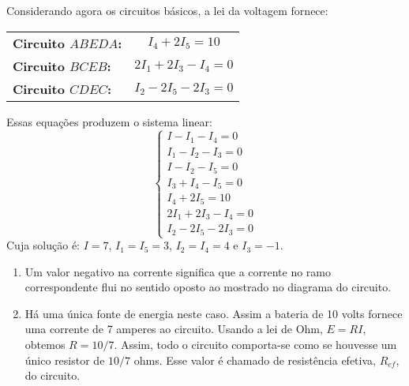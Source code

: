 \begin{exemplos}
\begin{solucao}
\begin{enumerate}
            Considerando agora os circuitos básicos, a lei da voltagem fornece:
            \begin{center}
                \begin{tabular}{lc}
                    \textbf{Circuito $ABEDA$:} & $I_4 + 2I_5 = 10$\\
                    \textbf{Circuito $BCEB$:} & $2I_1 + 2I_3 - I_4 = 0$\\
                    \textbf{Circuito $CDEC$:} & $I_2 - 2I_5 - 2I_3 = 0$
                \end{tabular}
            \end{center}
            Essas equações produzem o sistema linear:
            \[
                \begin{cases}
                    I - I_1 - I_4 = 0\\
                    I_1 - I_2 - I_3 = 0\\
                    I - I_2 - I_5 = 0\\
                    I_3 + I_4 - I_5 = 0\\
                    I_4 + 2I_5 = 10\\
                    2I_1 + 2I_3 - I_4 = 0\\
                    I_2 - 2I_5 - 2I_3 = 0
                \end{cases}
            \]
            Cuja solução é: $I = 7$, $I_1 = I_5 = 3$, $I_2 = I_4 = 4$ e $I_3 = -1$.
        \end{enumerate}
    \end{solucao}
\end{exemplos}


\begin{observacoes}
    \begin{enumerate}
        \item Um valor negativo na corrente significa que a corrente no ramo correspondente flui no sentido oposto ao mostrado no diagrama do circuito.

        \item Há uma única fonte de energia neste caso. Assim a bateria de 10 volts fornece uma corrente de 7 amperes ao circuito. Usando a lei de Ohm, $E = RI$, obtemos $R = 10/7$. Assim, todo o circuito comporta-se como se houvesse um único resistor de $10/7$ ohms. Esse valor é chamado de \textrm{resistência efetiva}, $R_{ef}$, do circuito.
    \end{enumerate}
\end{observacoes}
